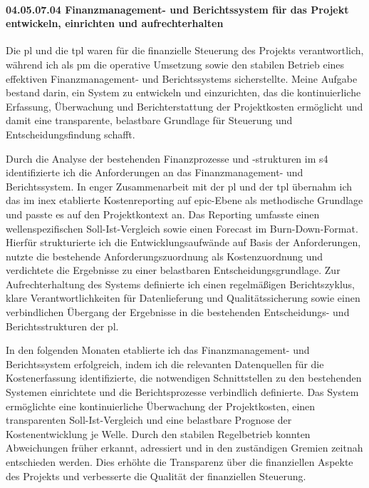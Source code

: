\paragraph*{04.05.07.04 Finanzmanagement- und Berichtssystem für das Projekt entwickeln, einrichten und
aufrechterhalten}
\label{para:04.05.07.04_Finanzmanagement}

\par Die \gls{pl} und die \gls{tpl} waren für die finanzielle Steuerung des Projekts verantwortlich, während ich als \gls{pm} die operative Umsetzung sowie den stabilen Betrieb eines effektiven Finanzmanagement- und Berichtssystems sicherstellte. Meine Aufgabe bestand darin, ein System zu entwickeln und einzurichten, das die kontinuierliche Erfassung, Überwachung und Berichterstattung der Projektkosten ermöglicht und damit eine transparente, belastbare Grundlage für Steuerung und Entscheidungsfindung schafft.

\par Durch die Analyse der bestehenden Finanzprozesse und -strukturen im \gls{s4} identifizierte ich die Anforderungen an das Finanzmanagement- und Berichtssystem. In enger Zusammenarbeit mit der \gls{pl} und der \gls{tpl} übernahm ich das im \gls{inex} etablierte Kostenreporting auf \gls{epic}-Ebene als methodische Grundlage und passte es auf den Projektkontext an. Das Reporting umfasste einen wellenspezifischen Soll-Ist-Vergleich sowie einen Forecast im Burn-Down-Format. Hierfür strukturierte ich die Entwicklungsaufwände auf Basis der Anforderungen, nutzte die bestehende Anforderungszuordnung als Kostenzuordnung und verdichtete die Ergebnisse zu einer belastbaren Entscheidungsgrundlage. Zur Aufrechterhaltung des Systems definierte ich einen regelmäßigen Berichtszyklus, klare Verantwortlichkeiten für Datenlieferung und Qualitätssicherung sowie einen verbindlichen Übergang der Ergebnisse in die bestehenden Entscheidungs- und Berichtsstrukturen der \gls{pl}.

\par In den folgenden Monaten etablierte ich das Finanzmanagement- und Berichtssystem erfolgreich, indem ich die relevanten Datenquellen für die Kostenerfassung identifizierte, die notwendigen Schnittstellen zu den bestehenden Systemen einrichtete und die Berichtsprozesse verbindlich definierte. Das System ermöglichte eine kontinuierliche Überwachung der Projektkosten, einen transparenten Soll-Ist-Vergleich und eine belastbare Prognose der Kostenentwicklung je Welle. Durch den stabilen Regelbetrieb konnten Abweichungen früher erkannt, adressiert und in den zuständigen Gremien zeitnah entschieden werden. Dies erhöhte die Transparenz über die finanziellen Aspekte des Projekts und verbesserte die Qualität der finanziellen Steuerung.

